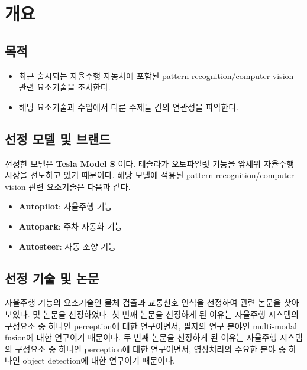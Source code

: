 \section{개요}{\label{sec:intro}}

\subsection{목적}
\begin{itemize}\tightlist
    \item 최근 출시되는 자율주행 자동차에 포함된 pattern recognition/computer vision 관련 요소기술을 조사한다.
    \item 해당 요소기술과 수업에서 다룬 주제들 간의 연관성을 파악한다.
\end{itemize}

\subsection{선정 모델 및 브랜드}
선정한 모델은 \textbf{Tesla Model S} 이다.
테슬라가 오토파일럿 기능을 앞세워 자율주행 시장을 선도하고 있기 때문이다.
해당 모델에 적용된 pattern recognition/computer vision 관련 요소기술은 다음과 같다.
\begin{itemize}\tightlist
    \item \textbf{Autopilot}: 자율주행 기능
    \item \textbf{Autopark}: 주차 자동화 기능
    \item \textbf{Autosteer}: 자동 조향 기능
\end{itemize}


\subsection{선정 기술 및 논문}
자율주행 기능의 요소기술인 물체 검출과 교통신호 인식을 선정하여 관련 논문을 찾아보았다.
\cite[Multi-modal fusion transformer for end-to-end autonomous driving]{Transfuser} 및 
\cite[YOLOv7: Trainable bag-of-freebies sets new state-of-the-art for real-time object detectors]{YOLOv7}
논문을 선정하였다.
첫 번째 논문을 선정하게 된 이유는 자율주행 시스템의 구성요소 중 하나인 perception에 대한 연구이면서,
필자의 연구 분야인 multi-modal fusion에 대한 연구이기 때문이다.
두 번째 논문을 선정하게 된 이유는 자율주행 시스템의 구성요소 중 하나인 perception에 대한 연구이면서,
영상처리의 주요한 분야 중 하나인 object detection에 대한 연구이기 때문이다.

